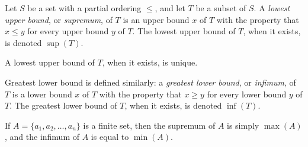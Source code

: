 \documentclass{article}
\begin{document}
Let $S$ be a set with a partial ordering $\leq$, and let $T$ be a subset of $S$. A \emph{lowest upper bound}, or \emph{supremum}, of $T$ is an upper bound $x$ of $T$ with the property that $x \leq y$ for every upper bound $y$ of $T$. The lowest upper bound of $T$, when it exists, is denoted $\operatorname{sup}(T)$.

A lowest upper bound of $T$, when it exists, is unique.

Greatest lower bound is defined similarly: a \emph{greatest lower bound}, or \emph{infimum}, of $T$ is a lower bound $x$ of $T$ with the property that $x \geq y$ for every lower bound $y$ of $T$. The greatest lower bound of $T$, when it exists, is denoted $\operatorname{inf}(T)$.

If $A = \{a_1,a_2,\ldots,a_n\}$ is a finite set, then the supremum of $A$ is simply $\max(A)$, and the infimum of $A$ is equal to $\min(A)$.
\end{document}
